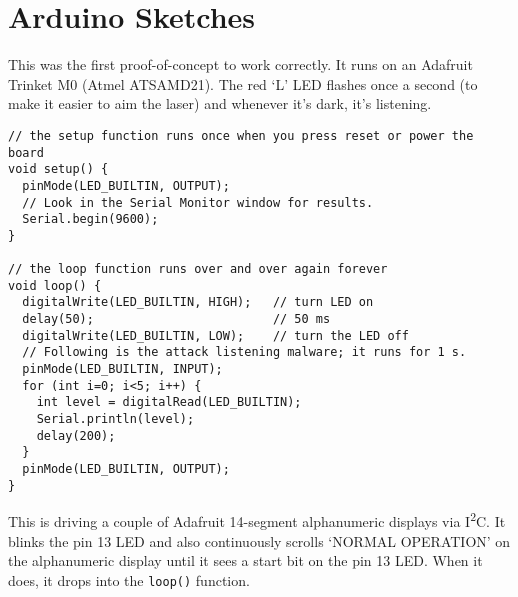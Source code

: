 \documentclass[a4paper,notitlepage]{article}
\begin{document}
\section{Arduino Sketches}
This was the first proof-of-concept to work correctly. It runs on an Adafruit
Trinket M0 (Atmel ATSAMD21). The red `L' LED flashes once a second (to make it
easier to aim the laser) and whenever it's dark, it's listening.
\begin{verbatim}
// the setup function runs once when you press reset or power the board
void setup() {
  pinMode(LED_BUILTIN, OUTPUT);
  // Look in the Serial Monitor window for results.
  Serial.begin(9600);
}

// the loop function runs over and over again forever
void loop() {
  digitalWrite(LED_BUILTIN, HIGH);   // turn LED on
  delay(50);                         // 50 ms
  digitalWrite(LED_BUILTIN, LOW);    // turn the LED off
  // Following is the attack listening malware; it runs for 1 s.
  pinMode(LED_BUILTIN, INPUT);
  for (int i=0; i<5; i++) {
    int level = digitalRead(LED_BUILTIN);
    Serial.println(level);
    delay(200);
  }
  pinMode(LED_BUILTIN, OUTPUT);
}
\end{verbatim}
This is driving a couple of Adafruit 14-segment alphanumeric displays via
I\textsuperscript{2}C. It blinks the pin 13 LED and also continuously scrolls
`NORMAL OPERATION' on the alphanumeric display until it sees a start bit on the
pin 13 LED. When it does, it drops into the \texttt{loop()} function.
\end{document}
